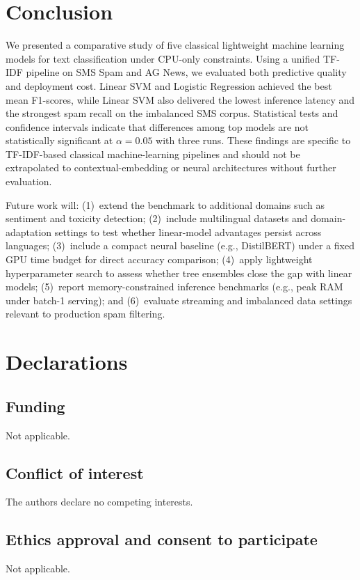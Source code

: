 \documentclass[pdflatex,sn-mathphys-num]{sn-jnl}
\begin{document}
\section{Conclusion}\label{sec:conclusion}

We presented a comparative study of five classical lightweight machine learning models for text classification under CPU-only constraints. Using a unified TF-IDF pipeline on SMS Spam and AG News, we evaluated both predictive quality and deployment cost. Linear SVM and Logistic Regression achieved the best mean F1-scores, while Linear SVM also delivered the lowest inference latency and the strongest spam recall on the imbalanced SMS corpus. Statistical tests and confidence intervals indicate that differences among top models are not statistically significant at $\alpha=0.05$ with three runs. These findings are specific to TF-IDF-based classical machine-learning pipelines and should not be extrapolated to contextual-embedding or neural architectures without further evaluation.

Future work will: (1)~extend the benchmark to additional domains such as sentiment and toxicity detection; (2)~include multilingual datasets and domain-adaptation settings to test whether linear-model advantages persist across languages; (3)~include a compact neural baseline (e.g., DistilBERT) under a fixed GPU time budget for direct accuracy comparison; (4)~apply lightweight hyperparameter search to assess whether tree ensembles close the gap with linear models; (5)~report memory-constrained inference benchmarks (e.g., peak RAM under batch-1 serving); and (6)~evaluate streaming and imbalanced data settings relevant to production spam filtering.

\section*{Declarations}

\subsection*{Funding}
Not applicable.

\subsection*{Conflict of interest}
The authors declare no competing interests.

\subsection*{Ethics approval and consent to participate}
Not applicable.
\end{document}
